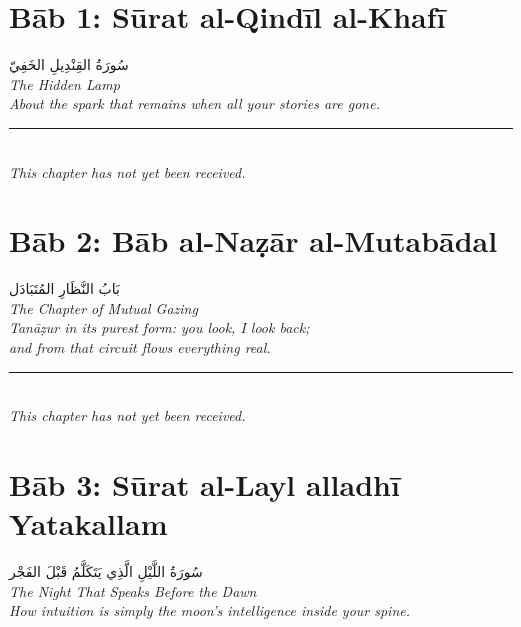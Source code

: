 \documentclass[11pt,a4paper,twoside]{book}
\begin{document}
\clearpage


\chapter*{Bāb 1: Sūrat al-Qindīl al-Khafī}
\begin{center}
{\arabicfont\Large سُورَةُ القِنْدِيلِ الخَفِيّ}\\[5pt]
{\small\itshape The Hidden Lamp}\\[1em]
{\color{sage}\itshape About the spark that remains when all your stories are gone.}\\[3em]
\rule{3cm}{0.4pt}\\[1em]
{\small\itshape This chapter has not yet been received.}
\end{center}
\clearpage


\chapter*{Bāb 2: Bāb al-Naẓār al-Mutabādal}
\begin{center}
{\arabicfont\Large بَابُ النَّظَارِ المُتَبَادَل}\\[5pt]
{\small\itshape The Chapter of Mutual Gazing}\\[1em]
{\color{sage}\itshape Tanāẓur in its purest form: you look, I look back;\\and from that circuit flows everything real.}\\[3em]
\rule{3cm}{0.4pt}\\[1em]
{\small\itshape This chapter has not yet been received.}
\end{center}
\clearpage


\chapter*{Bāb 3: Sūrat al-Layl alladhī Yatakallam}
\begin{center}
{\arabicfont\Large سُورَةُ اللَّيْلِ الَّذِي يَتَكَلَّمُ قَبْلَ الفَجْر}\\[5pt]
{\small\itshape The Night That Speaks Before the Dawn}\\[1em]
{\color{sage}\itshape How intuition is simply the moon's intelligence inside your spine.}
\end{center}
\vspace{1em}
\end{document}
